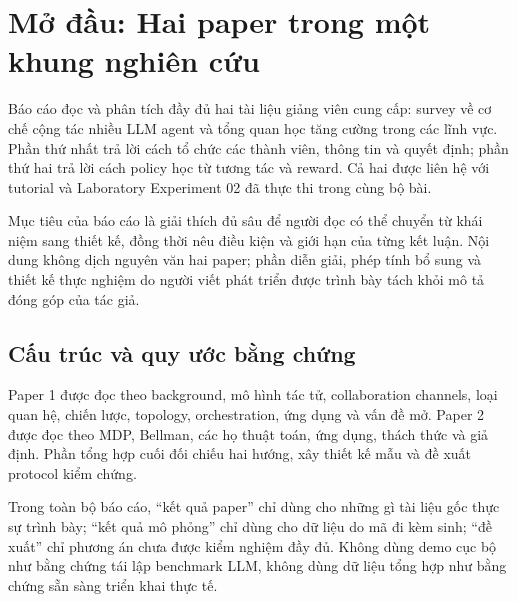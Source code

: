 \section{Mở đầu: Hai paper trong một khung nghiên
cứu}\label{mux1edf-ux111ux1ea7u-hai-paper-trong-mux1ed9t-khung-nghiuxean-cux1ee9u}

Báo cáo đọc và phân tích đầy đủ hai tài liệu giảng viên cung cấp: survey
về cơ chế cộng tác nhiều LLM agent và tổng quan học tăng cường trong các
lĩnh vực. Phần thứ nhất trả lời cách tổ chức các thành viên, thông tin
và quyết định; phần thứ hai trả lời cách policy học từ tương tác và
reward. Cả hai được liên hệ với tutorial và Laboratory Experiment 02 đã
thực thi trong cùng bộ bài.

Mục tiêu của báo cáo là giải thích đủ sâu để người đọc có thể chuyển từ
khái niệm sang thiết kế, đồng thời nêu điều kiện và giới hạn của từng
kết luận. Nội dung không dịch nguyên văn hai paper; phần diễn giải, phép
tính bổ sung và thiết kế thực nghiệm do người viết phát triển được trình
bày tách khỏi mô tả đóng góp của tác giả.

\subsection{Cấu trúc và quy ước bằng
chứng}\label{cux1ea5u-truxfac-vuxe0-quy-ux1b0ux1edbc-bux1eb1ng-chux1ee9ng}

Paper 1 được đọc theo background, mô hình tác tử, collaboration
channels, loại quan hệ, chiến lược, topology, orchestration, ứng dụng và
vấn đề mở. Paper 2 được đọc theo MDP, Bellman, các họ thuật toán, ứng
dụng, thách thức và giả định. Phần tổng hợp cuối đối chiếu hai hướng,
xây thiết kế mẫu và đề xuất protocol kiểm chứng.

Trong toàn bộ báo cáo, ``kết quả paper'' chỉ dùng cho những gì tài liệu
gốc thực sự trình bày; ``kết quả mô phỏng'' chỉ dùng cho dữ liệu do mã
đi kèm sinh; ``đề xuất'' chỉ phương án chưa được kiểm nghiệm đầy đủ.
Không dùng demo cục bộ như bằng chứng tái lập benchmark LLM, không dùng
dữ liệu tổng hợp như bằng chứng sẵn sàng triển khai thực tế.
